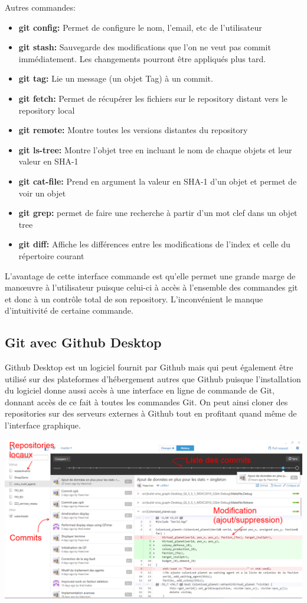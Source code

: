 \noindent Autres commandes:
\begin{itemize}
\item \textbf{git config:} Permet de configure le nom, l’email, etc de l’utilisateur
\item \textbf{git stash:} Sauvegarde des modifications que l’on ne veut pas commit immédiatement. Les changements pourront être appliqués plus tard.
\item \textbf{git tag:} Lie un message (un objet Tag) à un commit.
\item \textbf{git fetch:} Permet de récupérer les fichiers sur le repository distant vers le repository local
\item \textbf{git remote:} Montre toutes les versions distantes du repository
\item \textbf{git ls-tree:} Montre l’objet tree en incluant le nom de chaque objets et leur valeur en SHA-1
\item \textbf{git cat-file:} Prend en argument la valeur en SHA-1 d’un objet et permet de voir un objet
\item \textbf{git grep:} permet de faire une recherche à partir d’un mot clef dans un objet tree
\item \textbf{git diff:} Affiche les différences entre les modifications de l’index et celle du répertoire courant
\end{itemize}
L’avantage de cette interface commande est qu’elle permet une grande marge de manœuvre à l’utilisateur puisque celui-ci à accès à l’ensemble des commandes git et donc à un contrôle total de son repository. L’inconvénient le manque d’intuitivité de certaine commande.

\subsection{Git avec Github Desktop}

Github Desktop est un logiciel fournit par Github mais qui peut également être utilisé sur des plateformes d’hébergement autres que Github puisque l’installation du logiciel donne aussi accès à une interface en ligne de commande de Git, donnant accès de ce fait à toutes les commandes Git. On peut ainsi cloner des repositories sur des serveurs externes à Github tout en profitant quand même de l’interface graphique.

\begin{center}
	\includegraphics[width=\textwidth]{images/commit.png}
\end{center}
 
